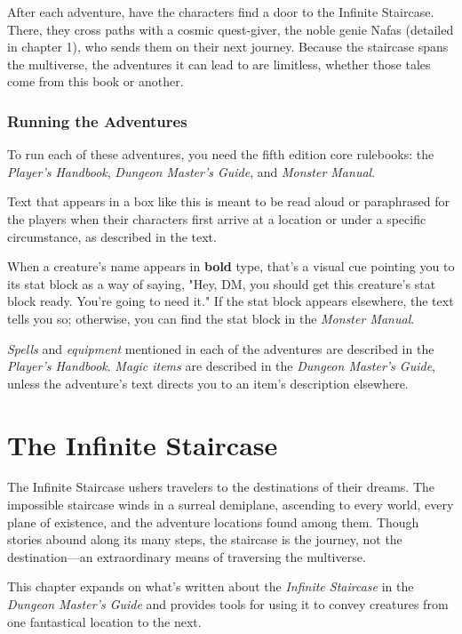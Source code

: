 \documentclass[10pt,a4paper,twoside,bg=print,twocolumn,openany,nodeprecatedcode]{dndbook}
\begin{document}
After each adventure, have the characters find a door to the Infinite Staircase. There, they cross paths with a cosmic quest-giver, the noble genie Nafas (detailed in chapter 1), who sends them on their next journey. Because the staircase spans the multiverse, the adventures it can lead to are limitless, whether those tales come from this book or another.

\subsection{Running the Adventures}
To run each of these adventures, you need the fifth edition core rulebooks: the \textit{Player's Handbook}, \textit{Dungeon Master's Guide}, and \textit{Monster Manual}.

\begin{DndReadAloud}{}
Text that appears in a box like this is meant to be read aloud or paraphrased for the players when their characters first arrive at a location or under a specific circumstance, as described in the text.

\end{DndReadAloud}

When a creature's name appears in \textbf{bold} type, that's a visual cue pointing you to its stat block as a way of saying, "Hey, DM, you should get this creature's stat block ready. You're going to need it." If the stat block appears elsewhere, the text tells you so; otherwise, you can find the stat block in the \textit{Monster Manual}.

\textit{Spells} and \textit{equipment} mentioned in each of the adventures are described in the \textit{Player's Handbook}. \textit{Magic items} are described in the \textit{Dungeon Master's Guide}, unless the adventure's text directs you to an item's description elsewhere.

\chapter{The Infinite Staircase}
The Infinite Staircase ushers travelers to the destinations of their dreams. The impossible staircase winds in a surreal demiplane, ascending to every world, every plane of existence, and the adventure locations found among them. Though stories abound along its many steps, the staircase is the journey, not the destination—an extraordinary means of traversing the multiverse.

This chapter expands on what's written about the \textit{Infinite Staircase} in the \textit{Dungeon Master's Guide} and provides tools for using it to convey creatures from one fantastical location to the next.
\end{document}
